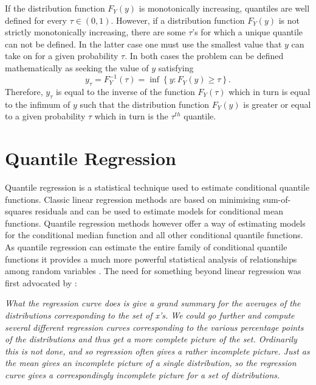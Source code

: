 \documentclass[12pt,a4paper]{report}
\begin{document}
If the distribution function $F_{Y}(y)$ is monotonically increasing, quantiles are well defined for every $\tau \in (0,1)$. However, if a distribution function $F_{Y}(y)$ is not strictly monotonically increasing, there are some $\tau$'s for which a unique quantile can not be defined. In the latter case one must use the smallest value that $y$ can take on for a given probability $\tau$. In both cases the problem can be defined mathematically as seeking the value of $y$ satisfying
\begin{equation}
\label{eq:Quantiles}
    y_{\tau}=F^{-1}_{Y}(\tau)=\inf\left\{y:F_{Y}(y)\geq\tau\right\}.
\end{equation}
\vspace{2mm}
Therefore, $y_{\tau}$ is equal to the inverse of the function $F_{Y}(\tau)$ which in turn is equal to the infimum of $y$ such that the distribution function $F_{Y}(y)$ is greater or equal to a given probability $\tau$ which in turn is the $\tau^{th}$ quantile.

\section{Quantile Regression}
Quantile regression is a statistical technique used to estimate conditional quantile functions. Classic linear regression methods are based on minimising sum-of-squares residuals and can be used to estimate models for conditional mean functions. Quantile regression methods however offer a way of estimating models for the conditional median function and all other conditional quantile functions. As quantile regression can estimate the entire family of
conditional quantile functions it provides a much more powerful statistical analysis of relationships among random variables \citep{QR-Intro}. The need for something beyond linear regression was first advocated by \citet{Motivation}:
\vspace{2mm}

\par \noindent
{\textit{What the regression curve does is give a grand summary for the averages of the distributions corresponding to the set of x's. We could go further and compute several different regression curves corresponding to the various percentage points of the distributions and thus get a more complete picture of the set. Ordinarily this is not done, and so regression often gives a rather incomplete picture. Just as the mean gives an incomplete picture of a single distribution, so the regression curve gives a correspondingly incomplete picture for a set of distributions.} \citep{Motivation}}
\vspace{2mm}
\end{document}
